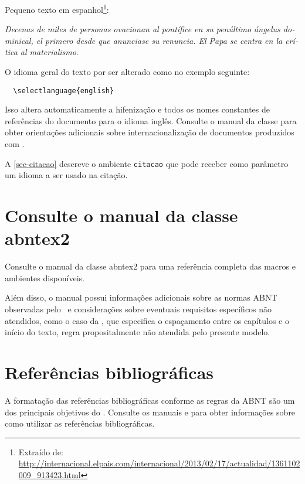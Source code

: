 Pequeno texto em espanhol\footnote{Extraído de:
  \url{http://internacional.elpais.com/internacional/2013/02/17/actualidad/1361102009_913423.html}}:

\foreignlanguage{spanish}{\textit{Decenas de miles de personas ovacionan al pontífice en su
    penúltimo ángelus dominical, el primero desde que anunciase su renuncia. El Papa se
    centra en la crítica al materialismo}}.

O idioma geral do texto por ser alterado como no exemplo seguinte:

\begin{verbatim}
  \selectlanguage{english}
\end{verbatim}

Isso altera automaticamente a hifenização e todos os nomes constantes de
referências do documento para o idioma inglês. Consulte o manual da classe
\cite{abntex2classe} para obter orientações adicionais sobre internacionalização de
documentos produzidos com \abnTeX.

A \autoref{sec-citacao} descreve o ambiente \texttt{citacao} que pode receber
como parâmetro um idioma a ser usado na citação.

\section{Consulte o manual da classe \textsf{abntex2}}

Consulte o manual da classe \textsf{abntex2} \cite{abntex2classe} para uma
referência completa das macros e ambientes disponíveis.

Além disso, o manual possui informações adicionais sobre as normas ABNT
observadas pelo \abnTeX\ e considerações sobre eventuais requisitos específicos
não atendidos, como o caso da , que
especifica o espaçamento entre os capítulos e o início do texto, regra
propositalmente não atendida pelo presente modelo.

\section{Referências bibliográficas}

A formatação das referências bibliográficas conforme as regras da ABNT são um
dos principais objetivos do \abnTeX. Consulte os manuais
 e  para obter informações
sobre como utilizar as referências bibliográficas.

